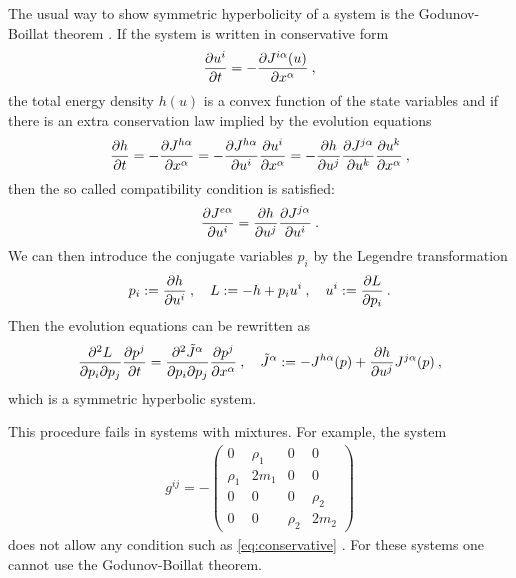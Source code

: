 The usual way to show symmetric hyperbolicity of a system is the Godunov-Boillat theorem \cite{Pavelka}. If the system is written in conservative form
\begin{align}
    \frac{\partial u^i}{\partial t} = - \frac{\partial J^{i \alpha}(u)}{\partial x^\alpha} \:, \label{eq:conservative}
\end{align}
the total energy density $h(u)$ is a convex function of the state variables and if there is an extra conservation law implied by the evolution equations
\begin{align}
    \frac{\partial h}{\partial t} = - \frac{\partial J^{h \alpha}}{\partial x^\alpha} = - \frac{\partial J^{h \alpha}}{\partial u^i} \frac{\partial u^i}{\partial x^\alpha} = - \frac{\partial h}{\partial u^j} \frac{\partial J^{j \alpha}}{\partial u^k} \frac{\partial u^k}{\partial x^\alpha} \:,
\end{align}
then the so called compatibility condition is satisfied:
\begin{align}
    \frac{\partial J^{e \alpha}}{\partial u^i} = \frac{\partial h}{\partial u^j} \frac{\partial J^{j \alpha}}{\partial u^i} \:.
\end{align}
We can then introduce the conjugate variables $p_i$ by the Legendre transformation 
\begin{align}
    p_i := \frac{\partial h}{\partial u^i} \:, \quad L := - h + p_i u^i \:, \quad u^i := \frac{\partial L}{\partial p_i} \:.
\end{align}
Then the evolution equations can be rewritten as
\begin{align}
    \frac{\partial^2 L}{\partial p_i \partial p_j} \frac{\partial p^j}{\partial t} = \frac{\partial^2 \tilde J^\alpha}{\partial p_i \partial p_j} \frac{\partial p^j}{\partial x^\alpha} \:, \quad \tilde J^\alpha := - J^{h \alpha}(p) + \frac{\partial h}{\partial u^j} J^{j \alpha}(p) \:,
\end{align}
which is a symmetric hyperbolic system. 

This procedure fails in systems with mixtures. For example, the system
\begin{align}
    g^{ij} = - \begin{pmatrix}
        0 & \rho_1 & 0 & 0 \\
        \rho_1 &  2 m_1  & 0 & 0 \\
        0 & 0 & 0 & \rho_2 \\
        0 & 0 & \rho_2 & 2 m_2
    \end{pmatrix}
\end{align}
does not allow any condition such as \eqref{eq:conservative} \cite{Generic}. For these systems one cannot use the Godunov-Boillat theorem. 

